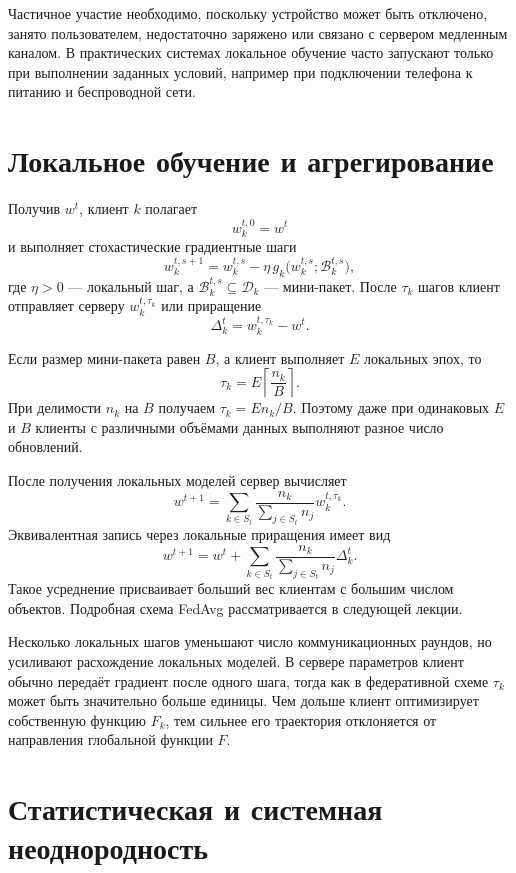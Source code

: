 Частичное участие необходимо, поскольку устройство может быть
отключено, занято пользователем, недостаточно заряжено или связано с
сервером медленным каналом. В практических системах локальное обучение
часто запускают только при выполнении заданных условий, например при
подключении телефона к питанию и беспроводной сети.

\section{Локальное обучение и агрегирование}

Получив \(w^t\), клиент \(k\) полагает
\[
    w_k^{t,0}=w^t
\]
и выполняет стохастические градиентные шаги
\[
    w_k^{t,s+1}
    =
    w_k^{t,s}
    -
    \eta\,
    g_k\bigl(w_k^{t,s};\mathcal B_k^{t,s}\bigr),
\]
где \(\eta>0\) --- локальный шаг, а
\(\mathcal B_k^{t,s}\subseteq\mathcal D_k\) --- мини-пакет. После
\(\tau_k\) шагов клиент отправляет серверу \(w_k^{t,\tau_k}\) или
приращение
\[
    \Delta_k^t=w_k^{t,\tau_k}-w^t.
\]

Если размер мини-пакета равен \(B\), а клиент выполняет \(E\)
локальных эпох, то
\[
    \tau_k
    =
    E\left\lceil\frac{n_k}{B}\right\rceil.
\]
При делимости \(n_k\) на \(B\) получаем \(\tau_k=En_k/B\). Поэтому
даже при одинаковых \(E\) и \(B\) клиенты с различными объёмами данных
выполняют разное число обновлений.

После получения локальных моделей сервер вычисляет
\[
    w^{t+1}
    =
    \sum_{k\in S_t}
    \frac{n_k}{\sum_{j\in S_t}n_j}
    w_k^{t,\tau_k}.
\]
Эквивалентная запись через локальные приращения имеет вид
\[
    w^{t+1}
    =
    w^t
    +
    \sum_{k\in S_t}
    \frac{n_k}{\sum_{j\in S_t}n_j}
    \Delta_k^t.
\]
Такое усреднение присваивает больший вес клиентам с большим числом
объектов. Подробная схема FedAvg рассматривается в следующей лекции.

Несколько локальных шагов уменьшают число коммуникационных раундов,
но усиливают расхождение локальных моделей. В сервере параметров
клиент обычно передаёт градиент после одного шага, тогда как в
федеративной схеме \(\tau_k\) может быть значительно больше единицы.
Чем дольше клиент оптимизирует собственную функцию \(F_k\), тем сильнее
его траектория отклоняется от направления глобальной функции \(F\).

\section{Статистическая и системная неоднородность}

